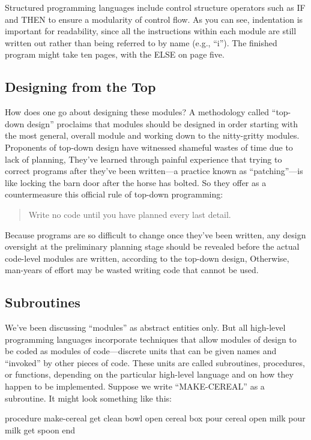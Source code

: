 %

Structured programming languages include control structure operators
such as IF and THEN to ensure a modularity of control flow. As you
can see, indentation is important for readability, since all the instructions
within each module are still written out rather than being referred
to by name (e.g., ``i''). The finished program might take ten pages,
with the ELSE on page five.


\subsection{Designing from the Top}
How does one go about designing these modules? A methodology called
``top-down design'' proclaims that modules should be designed in order
starting with the most general, overall module and working down to
the nitty-gritty modules. Proponents of top-down design have witnessed
shameful wastes of time due to lack of planning, They've learned through
painful experience that trying to correct programs after they've been
written---a practice known as {}``patching''---is like locking the
barn door after the horse has bolted. So they offer as a countermeasure
this official rule of top-down programming:

\begin{quote}
Write no code until you have planned every last detail.
\end{quote}
Because programs are so difficult to change once they've been written,
any design oversight at the preliminary planning stage should be revealed
before the actual code-level modules are written, according to the
top-down design, Otherwise, man-years of effort may be wasted writing
code that cannot be used.


\subsection{Subroutines}
We've been discussing {}``modules'' as abstract entities only. But
all high-level programming languages incorporate techniques that allow
modules of design to be coded as modules of code---discrete units
that can be given names and ``invoked'' by other pieces of code. These
units are called subroutines, procedures, or functions, depending
on the particular high-level language and on how they happen to be
implemented. Suppose we write {}``MAKE-CEREAL'' as a subroutine.
It might look something like this:

\begin{Code}
procedure make-cereal
   get clean bowl
   open cereal box
   pour cereal
   open milk
   pour milk
   get spoon
end
\end{Code}

